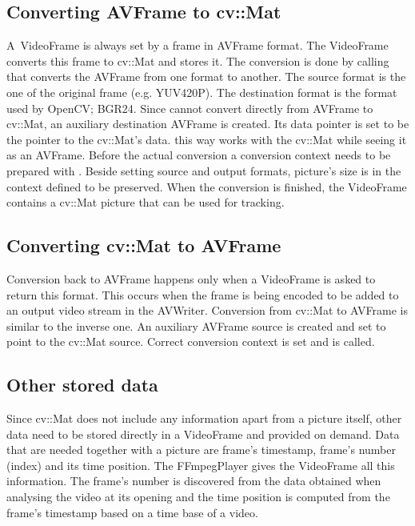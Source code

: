 \subsection{Converting AVFrame to cv::Mat}
A~VideoFrame is always set by a frame in AVFrame format. The VideoFrame converts this frame to cv::Mat and stores it. The conversion is done by calling  that converts the AVFrame from one format to another. The source format is the one of the original frame (e.g. YUV420P). The destination format is the format used by OpenCV; BGR24. Since  cannot convert directly from AVFrame to cv::Mat, an auxiliary destination AVFrame is created. Its data pointer is set to be the pointer to the cv::Mat’s data.  this way works with the cv::Mat while seeing it as an AVFrame. Before the actual conversion a conversion context needs to be prepared with . Beside setting source and output formats, picture’s size is in the context defined to be preserved. When the conversion is finished, the VideoFrame contains a cv::Mat picture that can be used for tracking.

\subsection{Converting cv::Mat to AVFrame}
Conversion back to AVFrame happens only when a VideoFrame is asked to return this format. This occurs when the frame is being encoded to be added to an output video stream in the AVWriter. Conversion from cv::Mat to AVFrame is similar to the inverse one. An auxiliary AVFrame source is created and set to point to the cv::Mat source. Correct conversion context is set and  is called.

\subsection{Other stored data}
Since cv::Mat does not include any information apart from a picture itself, other data need to be stored directly in a VideoFrame and provided on demand. Data that are needed together with a picture are frame’s timestamp, frame’s number (index) and its time position. The FFmpegPlayer gives the VideoFrame all this information. The frame’s number is discovered from the data obtained when analysing the video at its opening and the time position is computed from the frame’s timestamp based on a time base of a video.

